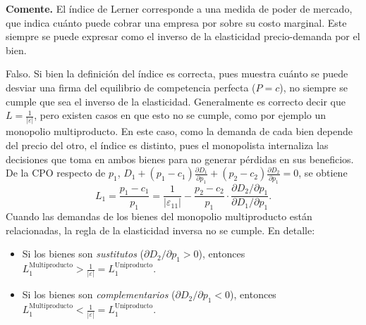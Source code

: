 \question \textbf{Comente.} El índice de Lerner corresponde a una medida de poder de mercado, que indica cuánto puede cobrar una empresa por sobre su costo marginal. Este siempre se puede expresar como el inverso de la elasticidad precio-demanda por el bien.
\begin{solution}
Falso. Si bien la definición del índice es correcta, pues muestra cuánto se puede desviar una firma del equilibrio de competencia perfecta ($P=c$), no siempre se cumple que sea el inverso de la elasticidad. Generalmente es correcto decir que $L = \frac{1}{|\varepsilon|}$, pero existen casos en que esto no se cumple, como por ejemplo un monopolio multiproducto. En este caso, como la demanda de cada bien depende del precio del otro, el índice es distinto, pues el monopolista internaliza las decisiones que toma en ambos bienes para no generar pérdidas en sus beneficios. De la CPO respecto de $p_1$, $D_1 + (p_1-c_1)\frac{\partial D_1}{\partial p_1} + (p_2-c_2)\frac{\partial D_2}{\partial p_1} = 0$, se obtiene
\[
  L_1 = \frac{p_1 - c_1}{p_1} = \frac{1}{|\varepsilon_{11}|} - \frac{p_2 - c_2}{p_1}\cdot\frac{\partial D_2/\partial p_1}{\partial D_1/\partial p_1}.
\]
Cuando las demandas de los bienes del monopolio multiproducto están relacionadas, la regla de la elasticidad inversa no se cumple. En detalle:
\begin{itemize}
  \item Si los bienes son \emph{sustitutos} ($\partial D_2/\partial p_1 > 0$), entonces $L^{\text{Multiproducto}}_1 > \frac{1}{|\varepsilon|} = L^{\text{Uniproducto}}_1$.
  \item Si los bienes son \emph{complementarios} ($\partial D_2/\partial p_1 < 0$), entonces $L^{\text{Multiproducto}}_1 < \frac{1}{|\varepsilon|} = L^{\text{Uniproducto}}_1$.
\end{itemize}

\end{solution}


